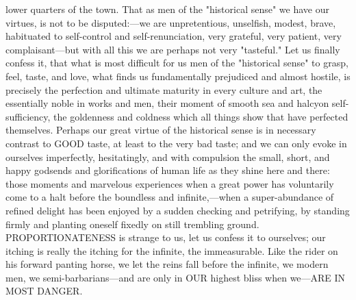 \documentclass[12pt]{article}
\begin{document}
lower quarters of the town. That as men of the "historical sense" we have our virtues, is not to be disputed:---we are unpretentious, unselfish, modest, brave, habituated to self-control and self-renunciation, very grateful, very patient, very complaisant---but with all this we are perhaps not very "tasteful." Let us finally confess it, that what is most difficult for us men of the "historical sense" to grasp, feel, taste, and love, what finds us fundamentally prejudiced and almost hostile, is precisely the perfection and ultimate maturity in every culture and art, the essentially noble in works and men, their moment of smooth sea and halcyon self-sufficiency, the goldenness and coldness which all things show that have perfected themselves. Perhaps our great virtue of the historical sense is in necessary contrast to GOOD taste, at least to the very bad taste; and we can only evoke in ourselves imperfectly, hesitatingly, and with compulsion the small, short, and happy godsends and glorifications of human life as they shine here and there: those moments and marvelous experiences when a great power has voluntarily come to a halt before the boundless and infinite,---when a super-abundance of refined delight has been enjoyed by a sudden checking and petrifying, by standing firmly and planting oneself fixedly on still trembling ground. PROPORTIONATENESS is strange to us, let us confess it to ourselves; our itching is really the itching for the infinite, the immeasurable. Like the rider on his forward panting horse, we let the reins fall before the infinite, we modern men, we semi-barbarians---and are only in OUR highest bliss when we---ARE IN MOST DANGER.
\end{document}
